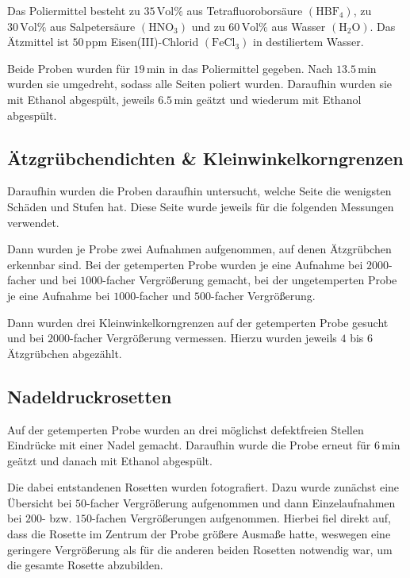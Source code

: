 \documentclass[12pt,a4paper]{scrartcl}
\numberwithin{equation}{section} %
\begin{document}
Das Poliermittel besteht zu $35\,\mathrm{Vol\%}$ aus
Tetrafluoroborsäure $(\mathrm{HBF_4})$, zu $30\,\mathrm{Vol\%}$ aus
Salpetersäure $(\mathrm{HNO_3})$ und zu $60\,\mathrm{Vol\%}$ aus
Wasser $(\mathrm{H_2O})$. Das Ätzmittel ist $50\,\mathrm{ppm}$
Eisen(III)-Chlorid $(\mathrm{FeCl_3})$ in destiliertem Wasser.

Beide Proben wurden für $19\mathrm{\,min}$ in das Poliermittel
gegeben. Nach $13.5\mathrm{\,min}$ wurden sie umgedreht, sodass alle
Seiten poliert wurden. Daraufhin wurden sie mit Ethanol abgespült,
jeweils $6.5\mathrm{\,min}$ geätzt und wiederum mit Ethanol abgespült.

\hypertarget{uxe4tzgruxfcbchendichten-kleinwinkelkorngrenzen}{%
\subsection{Ätzgrübchendichten \&
Kleinwinkelkorngrenzen}\label{uxe4tzgruxfcbchendichten-kleinwinkelkorngrenzen}}

Daraufhin wurden die Proben daraufhin untersucht, welche Seite die
wenigsten Schäden und Stufen hat. Diese Seite wurde jeweils für die
folgenden Messungen verwendet.

Dann wurden je Probe zwei Aufnahmen aufgenommen, auf denen
Ätzgrübchen erkennbar sind. Bei der getemperten Probe wurden je eine
Aufnahme bei $2000$-facher und bei $1000$-facher Vergrößerung
gemacht, bei der ungetemperten Probe je eine Aufnahme bei
$1000$-facher und $500$-facher Vergrößerung.

Dann wurden drei Kleinwinkelkorngrenzen auf der getemperten Probe
gesucht und bei $2000$-facher Vergrößerung vermessen. Hierzu wurden
jeweils $4$ bis $6$ Ätzgrübchen abgezählt.

\hypertarget{nadeldruckrosetten}{%
\subsection{Nadeldruckrosetten}\label{nadeldruckrosetten}}

Auf der getemperten Probe wurden an drei möglichst defektfreien Stellen
Eindrücke mit einer Nadel gemacht. Daraufhin wurde die Probe erneut für
$6\mathrm{\,min}$ geätzt und danach mit Ethanol abgespült.

Die dabei entstandenen Rosetten wurden fotografiert. Dazu wurde zunächst
eine Übersicht bei $50$-facher Vergrößerung aufgenommen und dann
Einzelaufnahmen bei $200$- bzw. $150$-fachen Vergrößerungen
aufgenommen. Hierbei fiel direkt auf, dass die Rosette im Zentrum der
Probe größere Ausmaße hatte, weswegen eine geringere Vergrößerung als
für die anderen beiden Rosetten notwendig war, um die gesamte Rosette
abzubilden.
\end{document}
